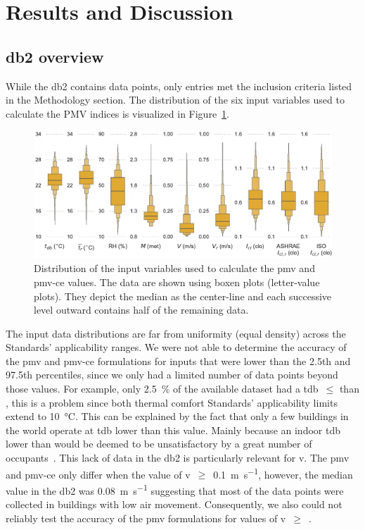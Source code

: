 \section{Results and Discussion}\label{sec:results}

\subsection{\ac{db2} overview}\label{subsec:comfort-db-overview}
While the \ac{db2} contains  data points, only  entries met the inclusion criteria listed in the Methodology section.
The distribution of the six input variables used to calculate the PMV indices is visualized in Figure~\ref{fig:dist_input_data}.
\begin{figure}[htb!]
    \centering
    \includegraphics[width=\textwidth]{figures/dist_input_data}
    \caption{Distribution of the input variables used to calculate the \ac{pmv} and \ac{pmv-ce} values.
    The data are shown using boxen plots (letter-value plots).
    They depict the median as the center-line and each successive level outward contains half of the remaining data.}
    \label{fig:dist_input_data}
\end{figure}
The input data distributions are far from uniformity (equal density) across the Standards' applicability ranges.
We were not able to determine the accuracy of the \ac{pmv} and \ac{pmv-ce} formulations for inputs that were lower than the 2.5th and 97.5th percentiles, since we only had a limited number of data points beyond those values.
For example, only \qty{2.5}{\percent} of the available dataset had a \ac{tdb}~$\leq$ than , this is a problem since both thermal comfort Standards' applicability limits extend to \qty{10}{\celsius}.
This can be explained by the fact that only a few buildings in the world operate at \ac{tdb} lower than this value.
Mainly because an indoor \ac{tdb} lower than  would be deemed to be unsatisfactory by a great number of occupants~\cite{iso7730}.
This lack of data in the \ac{db2} is particularly relevant for \ac{v}.
The \ac{pmv} and \ac{pmv-ce} only differ when the value of \ac{v}~$\geq$~\qty{0.1}{\m\per\s}, however, the median value in the \ac{db2} was \qty{0.08}{\m\per\s} suggesting that most of the data points were collected in buildings with low air movement.
Consequently, we also could not reliably test the accuracy of the \ac{pmv} formulations for values of \ac{v}~$\geq$~.

